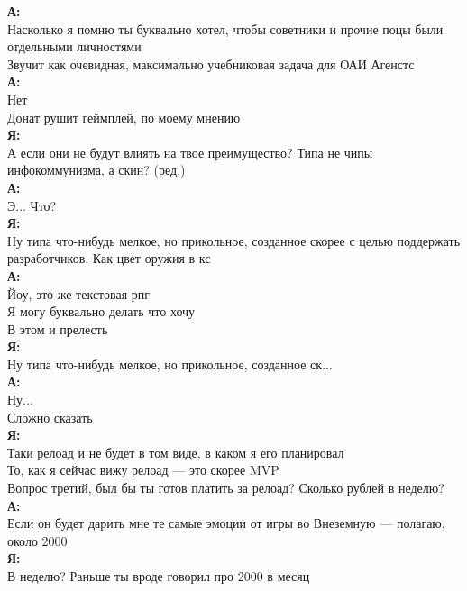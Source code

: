 \textbf{А:}\\
Насколько я помню ты буквально хотел, чтобы советники и прочие поцы были отдельными личностями\\
Звучит как очевидная, максимально учебниковая задача для ОАИ Агенстс\\

\textbf{А:}\\
Нет\\
Донат рушит геймплей, по моему мнению\\

\textbf{Я:}\\
А если они не будут влиять на твое преимущество? Типа не чипы инфокоммунизма, а скин? (ред.)\\

\textbf{А:}\\
Э... Что?\\

\textbf{Я:}\\
Ну типа что-нибудь мелкое, но прикольное, созданное скорее с целью поддержать разработчиков. Как цвет оружия в кс\\

\textbf{А:}\\
Йоу, это же текстовая рпг\\
Я могу буквально делать что хочу\\
В этом и прелесть\\

\textbf{Я:}\\
Ну типа что-нибудь мелкое, но прикольное, созданное ск...\\
\textbf{А:}\\
Ну...\\
Сложно сказать\\
\textbf{Я:}\\
Таки релоад и не будет в том виде, в каком я его планировал\\
То, как я сейчас вижу релоад — это скорее MVP\\
Вопрос третий, был бы ты готов платить за релоад? Сколько рублей в неделю?\\

\textbf{А:}\\
Если он будет дарить мне те самые эмоции от игры во Внеземную — полагаю, около 2000\\

\textbf{Я:}\\
В неделю? Раньше ты вроде говорил про 2000 в месяц\\

